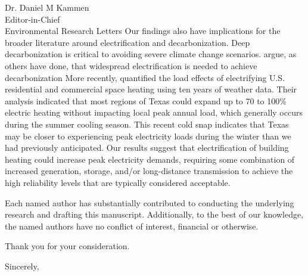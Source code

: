 \documentclass{scrartcl}
\begin{document}
\begin{letter}{Dr. Daniel M Kammen\\Editor-in-Chief\\Environmental Research Letters}
	Our findings also have implications for the broader literature around electrification and decarbonization.
	Deep decarbonization is critical to avoiding severe climate change scenarios.
	\citet{williams_decarbonization:2012} argue, as others have done, that widespread electrification is needed to achieve decarbonization
	More recently, \citet{waite_heating:2020} quantified the load effects of electrifying U.S. residential and commercial space heating using ten years of weather data.
	Their analysis indicated that most regions of Texas could expand up to 70 to 100\% electric heating without impacting local peak annual load, which generally occurs during the summer cooling season.
	This recent cold snap indicates that Texas may be closer to experiencing peak electricity loads during the winter than we had previously anticipated.
	Our results suggest that electrification of building heating could increase peak electricity demands, requiring some combination of increased generation, storage, and/or long-distance transmission to achieve the high reliability levels that are typically considered acceptable.

	Each named author has substantially contributed to conducting the underlying research and drafting this manuscript.
	Additionally, to the best of our knowledge, the named authors have no conflict of interest, financial or otherwise.

	Thank you for your consideration.

	\closing{Sincerely,}

	
	


\end{letter}
\end{document}
